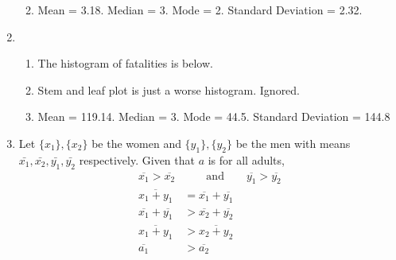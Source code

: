 \begin{enumerate}
\begin{enumerate}
		\begin{figure}[H]
			\centering
		\end{figure}
		
		\item Mean = 3.18. Median = 3. Mode = 2. Standard Deviation = 2.32.
		
		
	\end{enumerate}
	
	\item \begin{enumerate}
		\item The histogram of fatalities is below. \\
		\begin{figure}[H]
			\centering
		\end{figure}
		
		\item Stem and leaf plot is just a worse histogram. Ignored.
		\item Mean = 119.14. Median = 3. Mode = 44.5. Standard Deviation = 144.8
	\end{enumerate}
	
	\item Let $ \{x_1\} , \{x_2\} $ be the women and $ \{y_1\} , \{y_2\} $ be the men with means $ \bar{x_1}, \bar{x_2}, \bar{y_1}, \bar{y_2} $ respectively. Given that $ a $ is for all adults,
	\begin{subequations}
		\begin{align}
			\overline{x_1} > \overline{x_2} &\qquad \text{and} \qquad \overline{y_1} > \overline{y_2} \\
			\overline{x_1 + y_1} &= \overline{x_1} + \overline{y_1} \\
			\overline{x_1} + \overline{y_1} &> \overline{x_2} + \overline{y_2} \\
			\overline{x_1 + y_1} &> \overline{x_2 + y_2} \\
			\overline{a_1} &> \overline{a_2}
		\end{align}
		

\end{subequations}
\end{enumerate}
